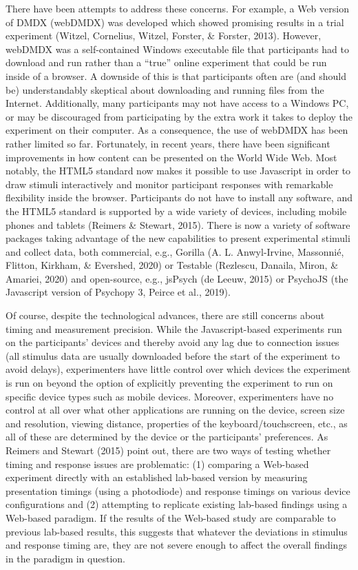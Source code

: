 \documentclass[
  english,
  man]{apa6}
\begin{document}
There have been attempts to address these concerns. For example, a Web version of DMDX (webDMDX) was developed which showed promising results in a trial experiment (Witzel, Cornelius, Witzel, Forster, \& Forster, 2013). However, webDMDX was a self-contained Windows executable file that participants had to download and run rather than a ``true'' online experiment that could be run inside of a browser. A downside of this is that participants often are (and should be) understandably skeptical about downloading and running files from the Internet. Additionally, many participants may not have access to a Windows PC, or may be discouraged from participating by the extra work it takes to deploy the experiment on their computer. As a consequence, the use of webDMDX has been rather limited so far. Fortunately, in recent years, there have been significant improvements in how content can be presented on the World Wide Web. Most notably, the HTML5 standard now makes it possible to use Javascript in order to draw stimuli interactively and monitor participant responses with remarkable flexibility inside the browser. Participants do not have to install any software, and the HTML5 standard is supported by a wide variety of devices, including mobile phones and tablets (Reimers \& Stewart, 2015). There is now a variety of software packages taking advantage of the new capabilities to present experimental stimuli and collect data, both commercial, e.g., Gorilla (A. L. Anwyl-Irvine, Massonnié, Flitton, Kirkham, \& Evershed, 2020) or Testable (Rezlescu, Danaila, Miron, \& Amariei, 2020) and open-source, e.g., jsPsych (de Leeuw, 2015) or PsychoJS (the Javascript version of Psychopy 3, Peirce et al., 2019).

Of course, despite the technological advances, there are still concerns about timing and measurement precision. While the Javascript-based experiments run on the participants' devices and thereby avoid any lag due to connection issues (all stimulus data are usually downloaded before the start of the experiment to avoid delays), experimenters have little control over which devices the experiment is run on beyond the option of explicitly preventing the experiment to run on specific device types such as mobile devices. Moreover, experimenters have no control at all over what other applications are running on the device, screen size and resolution, viewing distance, properties of the keyboard/touchscreen, etc., as all of these are determined by the device or the participants' preferences. As Reimers and Stewart (2015) point out, there are two ways of testing whether timing and response issues are problematic: (1) comparing a Web-based experiment directly with an established lab-based version by measuring presentation timings (using a photodiode) and response timings on various device configurations and (2) attempting to replicate existing lab-based findings using a Web-based paradigm. If the results of the Web-based study are comparable to previous lab-based results, this suggests that whatever the deviations in stimulus and response timing are, they are not severe enough to affect the overall findings in the paradigm in question.
\end{document}
